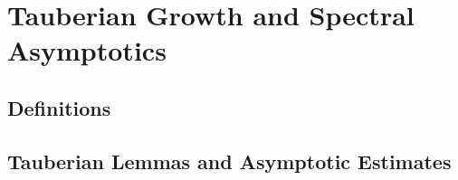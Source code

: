\section{Tauberian Growth and Spectral Asymptotics}
\label{sec:tauberian_growth}



\subsection{Definitions}


\subsection{Tauberian Lemmas and Asymptotic Estimates}






















